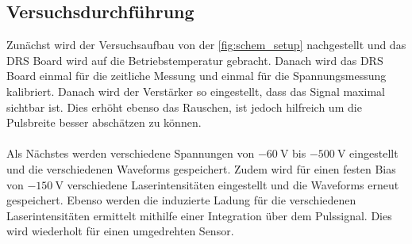\subsection{Versuchsdurchführung}
\label{sec:versuchsdurchfuehrung}
Zunächst wird der Versuchsaufbau von der \autoref{fig:schem_setup} nachgestellt und das DRS Board wird auf die Betriebstemperatur gebracht. Danach wird das DRS Board einmal für die zeitliche Messung und einmal für die Spannungsmessung kalibriert. Danach wird der Verstärker so eingestellt, dass das Signal maximal sichtbar ist. Dies erhöht ebenso das Rauschen, ist jedoch hilfreich um die Pulsbreite besser abschätzen zu können.\\\\
Als Nächstes werden verschiedene Spannungen von $\SI{-60}{\volt}$ bis $\SI{-500}{\volt}$ eingestellt und die verschiedenen Waveforms gespeichert. Zudem wird für einen festen Bias von $\SI{-150}{\volt}$ verschiedene Laserintensitäten eingestellt und die Waveforms erneut gespeichert. Ebenso werden die induzierte Ladung für die verschiedenen Laserintensitäten ermittelt mithilfe einer Integration über dem Pulssignal. Dies wird wiederholt für einen umgedrehten Sensor. 